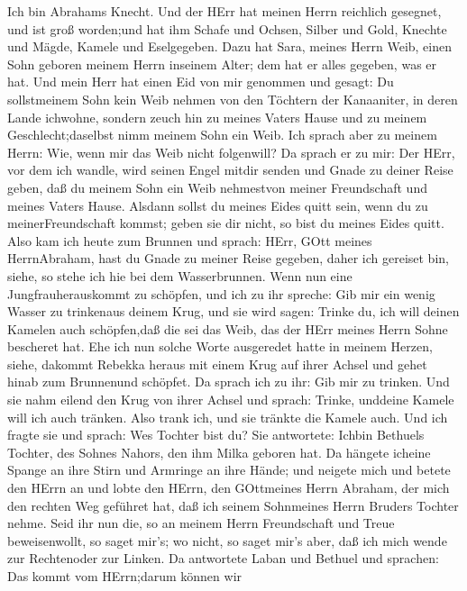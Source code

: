 Ich bin Abrahams Knecht.  Und der HErr hat meinen Herrn
reichlich gesegnet, und ist groß worden;und hat ihm Schafe und Ochsen,
Silber und Gold, Knechte und Mägde, Kamele und Eselgegeben.
 Dazu hat Sara, meines Herrn Weib, einen Sohn geboren
meinem Herrn inseinem Alter; dem hat er alles gegeben, was er hat.
 Und mein Herr hat einen Eid von mir genommen und gesagt:
Du sollstmeinem Sohn kein Weib nehmen von den Töchtern der Kanaaniter,
in deren Lande ichwohne,  sondern zeuch hin zu meines
Vaters Hause und zu meinem Geschlecht;daselbst nimm meinem Sohn ein
Weib.  Ich sprach aber zu meinem Herrn: Wie, wenn mir das
Weib nicht folgenwill?  Da sprach er zu mir: Der HErr, vor
dem ich wandle, wird seinen Engel mitdir senden und Gnade zu deiner
Reise geben, daß du meinem Sohn ein Weib nehmestvon meiner Freundschaft
und meines Vaters Hause.  Alsdann sollst du meines Eides
quitt sein, wenn du zu meinerFreundschaft kommst; geben sie dir nicht,
so bist du meines Eides quitt.  Also kam ich heute zum
Brunnen und sprach: HErr, GOtt meines HerrnAbraham, hast du Gnade zu
meiner Reise gegeben, daher ich gereiset bin,  siehe, so
stehe ich hie bei dem Wasserbrunnen. Wenn nun eine Jungfrauherauskommt
zu schöpfen, und ich zu ihr spreche: Gib mir ein wenig Wasser zu
trinkenaus deinem Krug,  und sie wird sagen: Trinke du, ich
will deinen Kamelen auch schöpfen,daß die sei das Weib, das der HErr
meines Herrn Sohne bescheret hat.  Ehe ich nun solche Worte
ausgeredet hatte in meinem Herzen, siehe, dakommt Rebekka heraus mit
einem Krug auf ihrer Achsel und gehet hinab zum Brunnenund schöpfet. Da
sprach ich zu ihr: Gib mir zu trinken.  Und sie nahm eilend
den Krug von ihrer Achsel und sprach: Trinke, unddeine Kamele will ich
auch tränken. Also trank ich, und sie tränkte die Kamele auch.
 Und ich fragte sie und sprach: Wes Tochter bist du? Sie
antwortete: Ichbin Bethuels Tochter, des Sohnes Nahors, den ihm Milka
geboren hat. Da hängete icheine Spange an ihre Stirn und Armringe an
ihre Hände;  und neigete mich und betete den HErrn an und
lobte den HErrn, den GOttmeines Herrn Abraham, der mich den rechten Weg
geführet hat, daß ich seinem Sohnmeines Herrn Bruders Tochter nehme.
 Seid ihr nun die, so an meinem Herrn Freundschaft und
Treue beweisenwollt, so saget mir's; wo nicht, so saget mir's aber, daß
ich mich wende zur Rechtenoder zur Linken.  Da antwortete
Laban und Bethuel und sprachen: Das kommt vom HErrn;darum können wir
